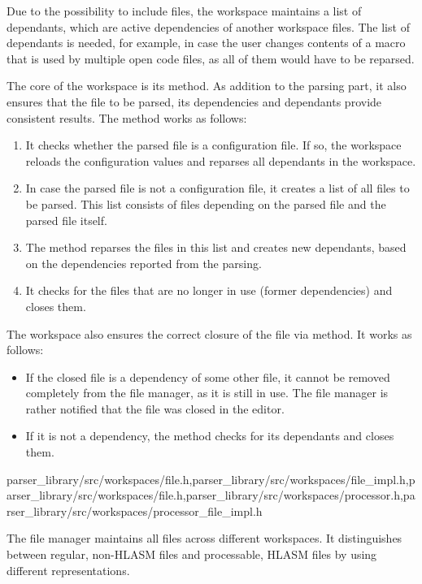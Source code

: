 Due to the possibility to include files, the workspace maintains a list of dependants, which are  active dependencies of another workspace files. The list of dependants is needed, for example, in case the user changes contents of a macro that is used by multiple open code files, as all of them would have to be reparsed.

The core of the workspace is its  method. As addition to the parsing part, it also ensures that the file to be parsed, its dependencies and dependants provide consistent results. The method works as follows:

\begin{enumerate}
	\item It checks whether the parsed file is a configuration file. If so, the workspace reloads the configuration values and reparses all dependants in the workspace.
	\item In case the parsed file is not a configuration file, it creates a list of all files to be parsed. This list consists of files depending on the parsed file and the parsed file itself.
	\item The method reparses the files in this list and creates new dependants, based on the dependencies reported from the parsing.
	\item It checks for the files that are no longer in use (former dependencies) and closes them.
\end{enumerate}

The workspace also ensures the correct closure of the file via  method. It works as follows:

\begin{itemize}
	\item If the closed file is a dependency of some other file, it cannot be removed completely from the file manager, as it is still in use. The file manager is rather notified that the file was closed in the editor.
	\item If it is not a dependency, the method checks for its dependants and closes them. 
\end{itemize}                        

{parser\_library/src/workspaces/file.h,parser\_library/src/workspaces/file\_impl.h,parser\_library/src/workspaces/file.h,parser\_library/src/workspaces/processor.h,parser\_library/src/workspaces/processor\_file\_impl.h}

The file manager maintains all files across different workspaces. It distinguishes between regular, non-HLASM files and processable, HLASM files by using different representations.

